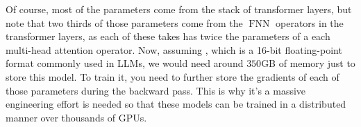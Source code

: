 \documentclass[11pt,a4paper]{article}
\newcommand\op[1]{\operatorname{#1}}
\begin{document}
\begin{enumerate}[label=(\alph*)]
          Of course, most of the parameters come from the stack of transformer
          layers, but note that two thirds of those parameters come from the
          $\op{FNN}$ operators in the transformer layers, as each of these takes
          has twice the parameters of a each multi-head attention operator.
          Now, assuming
          ,
          which is a 16-bit floating-point format commonly used in LLMs, we
          would need around $350$GB of memory just to store this model.
          To train it, you need to further store the gradients of each of those
          parameters during the backward pass.
          This is why it's a massive engineering effort is needed so that these
          models can be trained in a distributed manner over thousands of GPUs.
\end{enumerate}
\end{document}
